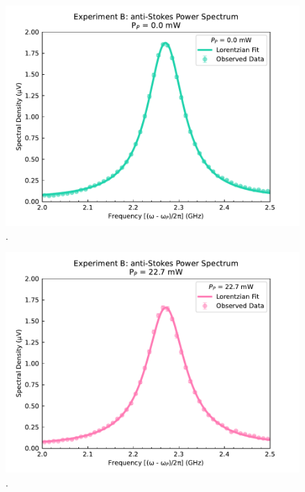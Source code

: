 \begin{figure}[t]
  \centering
  \includegraphics[width=\textwidth]{figs/3-Cooling/P-P anti-Stokes Fit - 0mW.pdf}
  \caption{.}
  \label{fig:Cooling:P-P anti-Stokes Fit - 0mW}
\end{figure}

\begin{figure}[t]
  \centering
  \includegraphics[width=\textwidth]{figs/3-Cooling/P-P anti-Stokes Fit - 55mW.pdf}
  \caption{.}
  \label{fig:Cooling:P-P anti-Stokes Fit - 55mW}
\end{figure}

